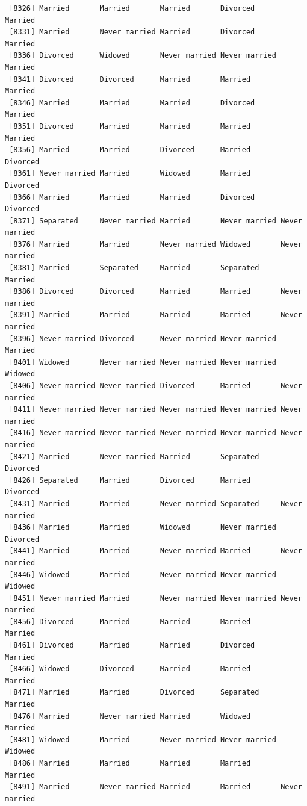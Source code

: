 \documentclass[
  letterpaper,
  DIV=11,
  numbers=noendperiod,
  oneside]{scrartcl}
\begin{document}
\begin{verbatim}
 [8326] Married       Married       Married       Divorced      Married      
 [8331] Married       Never married Married       Divorced      Married      
 [8336] Divorced      Widowed       Never married Never married Married      
 [8341] Divorced      Divorced      Married       Married       Married      
 [8346] Married       Married       Married       Divorced      Married      
 [8351] Divorced      Married       Married       Married       Married      
 [8356] Married       Married       Divorced      Married       Divorced     
 [8361] Never married Married       Widowed       Married       Divorced     
 [8366] Married       Married       Married       Divorced      Divorced     
 [8371] Separated     Never married Married       Never married Never married
 [8376] Married       Married       Never married Widowed       Never married
 [8381] Married       Separated     Married       Separated     Married      
 [8386] Divorced      Divorced      Married       Married       Never married
 [8391] Married       Married       Married       Married       Never married
 [8396] Never married Divorced      Never married Never married Married      
 [8401] Widowed       Never married Never married Never married Widowed      
 [8406] Never married Never married Divorced      Married       Never married
 [8411] Never married Never married Never married Never married Never married
 [8416] Never married Never married Never married Never married Never married
 [8421] Married       Never married Married       Separated     Divorced     
 [8426] Separated     Married       Divorced      Married       Divorced     
 [8431] Married       Married       Never married Separated     Never married
 [8436] Married       Married       Widowed       Never married Divorced     
 [8441] Married       Married       Never married Married       Never married
 [8446] Widowed       Married       Never married Never married Widowed      
 [8451] Never married Married       Never married Never married Never married
 [8456] Divorced      Married       Married       Married       Married      
 [8461] Divorced      Married       Married       Divorced      Married      
 [8466] Widowed       Divorced      Married       Married       Married      
 [8471] Married       Married       Divorced      Separated     Married      
 [8476] Married       Never married Married       Widowed       Married      
 [8481] Widowed       Married       Never married Never married Widowed      
 [8486] Married       Married       Married       Married       Married      
 [8491] Married       Never married Married       Married       Never married

\end{verbatim}
\end{document}
